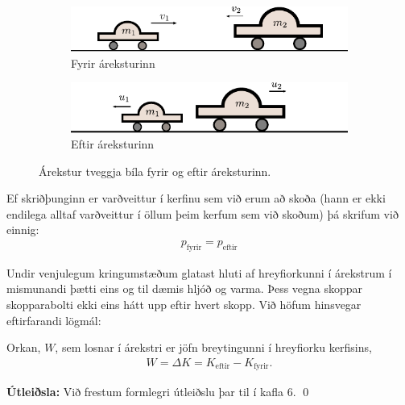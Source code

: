 \begin{figure}[H]
    \centering
\begin{subfigure}[h]{.4\textwidth}
    \centering
    \includegraphics[width=\linewidth]{figures/farekstur.pdf}
    \caption{Fyrir áreksturinn}
    \label{fig:farekstur}
\end{subfigure}
\hfill
\begin{subfigure}[h]{.4\textwidth}
    \centering
    \includegraphics[width=\linewidth]{figures/earekstor.pdf}
    \caption{Eftir áreksturinn}
    \label{fig:earekstor}
\end{subfigure}
\caption{Árekstur tveggja bíla fyrir og eftir áreksturinn.}
\label{fig:arekstur}
\end{figure}

Ef skriðþunginn er varðveittur í kerfinu sem við erum að skoða (hann er ekki endilega alltaf varðveittur í öllum þeim kerfum sem við skoðum) þá skrifum við einnig:
\begin{align*}
    p_{\text{fyrir}} = p_{\text{eftir}}
\end{align*}

Undir venjulegum kringumstæðum glatast hluti af hreyfiorkunni í árekstrum í mismunandi þætti eins og til dæmis hljóð og varma. Þess vegna skoppar skopparabolti ekki eins hátt upp eftir hvert skopp. Við höfum hinsvegar eftirfarandi lögmál:

\begin{tcolorbox}
\begin{theorem}
Orkan, $W$, sem losnar í árekstri er jöfn breytingunni í hreyfiorku kerfisins,
\begin{align*}
    W = \Delta K = K_{\text{eftir}} - K_{\text{fyrir}}. 
\end{align*}
\end{theorem}
\end{tcolorbox}

\textbf{Útleiðsla:} Við frestum formlegri útleiðslu þar til í kafla 6.  \qed

\vspace{0.25cm}

